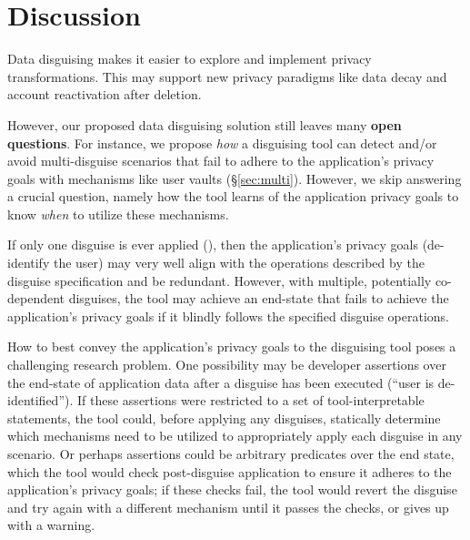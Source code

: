 \section{Discussion}
\label{s:disc}
Data disguising makes it easier to explore and implement privacy transformations. This may support
new privacy paradigms like data decay and account reactivation after deletion.

However, our proposed data disguising solution still leaves many \textbf{open questions}. 
%
For instance, we propose \emph{how} a disguising tool can detect and/or avoid multi-disguise
scenarios that fail to adhere to the application's privacy goals with mechanisms like user vaults (\S\ref{sec:multi}).
However, we skip answering a crucial question, namely how the tool learns of the application
privacy goals to know \emph{when} to utilize these mechanisms.

If only one disguise is ever applied (\eg \gdpr), then the application's
privacy goals (\eg de-identify the user) may very well align with the operations described by the
disguise specification and be redundant.  However, with multiple, potentially co-dependent disguises,
the tool may achieve an end-state that fails to achieve the application's privacy goals if it
blindly follows the specified disguise operations.

How to best convey the application's privacy goals to the disguising tool poses a challenging
research problem. One possibility may be developer assertions over the end-state of application data
after a disguise has been executed (\eg ``user is de-identified''). If these assertions were
restricted to a set of tool-interpretable statements, the tool could, before applying any disguises,
statically determine which mechanisms need to be utilized to appropriately apply each disguise in
any scenario.  Or perhaps assertions could be arbitrary predicates over the end state, which the
tool would check post-disguise application to ensure it adheres to the application's privacy goals;
if these checks fail, the tool would revert the disguise and try again with a different mechanism
until it passes the checks, or gives up with a warning.

